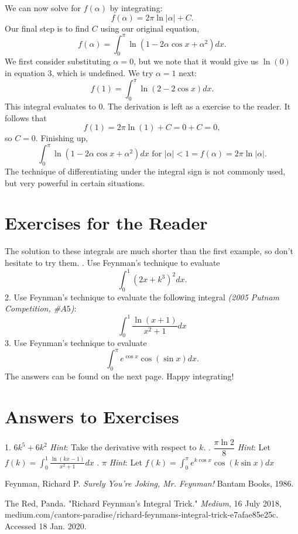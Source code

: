 \documentclass{article}
\begin{document}
We can now solve for $f(\alpha)$ by integrating:
\begin{equation}
    f(\alpha) = 2\pi\ln{|\alpha|}+C.
\end{equation}
Our final step is to find $C$ using our original equation,
$$f(\alpha)=\int_{0}^{\pi}\ln(1-2\alpha\cos{x}+\alpha^2)dx.$$
We first consider substituting $\alpha=0$, but we note that it would give us $\ln{(0)}$ in equation 3, which is undefined. We try $\alpha=1$ next:
$$f(1)=\int_{0}^{\pi} \ln(2-2\cos{x})dx.$$
This integral evaluates to 0. The derivation is left as a exercise to the reader.
\newline It follows that
$$f(1)=2\pi\ln{(1)}+C=0+C=0,$$ so $C=0.$
Finishing up,
$$\int_{0}^{\pi} \ln(1-2\alpha\cos{x}+\alpha^2)dx \text{ for } |\alpha|<1 = f(\alpha) = \boxed{2\pi\ln{|\alpha|}}.$$ 
The technique of differentiating under the integral sign is not commonly used, but very powerful in certain situations.

\section*{Exercises for the Reader}
The solution to these integrals are much shorter than the first example, so don't hesitate to try them.
\newline {}. Use Feynman's technique to evaluate
$$\int_{0}^{1}(2x+k^3)^2dx.$$
2. Use Feynman's technique to evaluate the following integral \textit{(2005 Putnam Competition, #$A5$)}:
$$\int_{0}^{1}\frac{\ln(x+1)}{x^2+1}dx$$
3. Use Feynman's technique to evaluate
$$\int_{0}^{\pi}e^{\cos{x}}\cos{(\sin{x})}dx.$$
The answers can be found on the next page. Happy integrating!

\newpage
\section*{Answers to Exercises}
1. $\boxed{6k^5+6k^2}$
\newline \newline \textit{Hint}: Take the derivative with respect to $k$.
\newline {}. $\boxed{\dfrac{\pi\ln{2}}{8}}$
\newline \textit{Hint}: Let $\displaystyle{f(k)=\int_{0}^{1}\frac{\ln({kx-1})}{x^2+1}}dx$
\newline {}. $\boxed{\pi}$
\newline \textit{Hint}: Let $\displaystyle{f(k)=\int_{0}^{\pi}e^{k\cos{x}}\cos({k\sin{x}})}dx$
\begin{thebibliography}{2}
Feynman, Richard P.
\textit{Surely You're Joking, Mr. Feynman!}
Bantam Books, 1986.

The Red, Panda. "Richard Feynman's Integral Trick." 
\textit{Medium}, 16 July 2018, medium.com/cantors-paradise/richard-feynmans-integral-trick-e7afae85e25c. Accessed 18 Jan. 2020.
\end{thebibliography}
\end{document}
